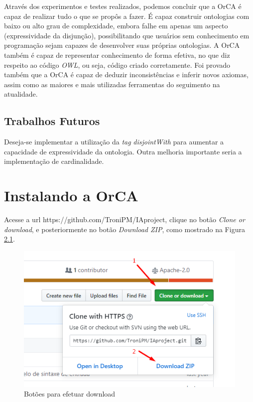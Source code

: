 \documentclass{bcc}
\begin{document}
Através dos experimentos e testes realizados, podemos concluir que a OrCA é capaz de realizar tudo o que se propôs a fazer. É capaz construir ontologias com baixo ou alto grau de complexidade, embora falhe em apenas um aspecto (expressividade da disjunção), possibilitando que usuários sem conhecimento em programação sejam capazes de desenvolver suas próprias ontologias. A OrCA também é capaz de representar conhecimento de forma efetiva, no que diz respeito ao código \textit{OWL}, ou seja, código criado corretamente. Foi provado também que a OrCA é capaz de deduzir inconsistências e inferir novos axiomas, assim como as maiores e mais utilizadas ferramentas do seguimento na atualidade.

\section{Trabalhos Futuros}
Deseja-se implementar a utilização da \textit{tag} \textit{disjointWith} para aumentar a capacidade de expressividade da ontologia. Outra melhoria importante seria a implementação de cardinalidade.




\appendix
\chapter{Instalando a OrCA}
\label{chap:apInstalacao}
Acesse a url https://github.com/TroniPM/IAproject, clique no botão \textit{Clone or download}, e posteriormente no botão \textit{Download ZIP}, como mostrado na Figura \ref{fig:install1}.

\begin{figure}[H]
\centering
\includegraphics[width=.7\textwidth]{Figuras/install1.png}
\caption{Botões para efetuar download} 
\label{fig:install1}
\end{figure}
\end{document}
